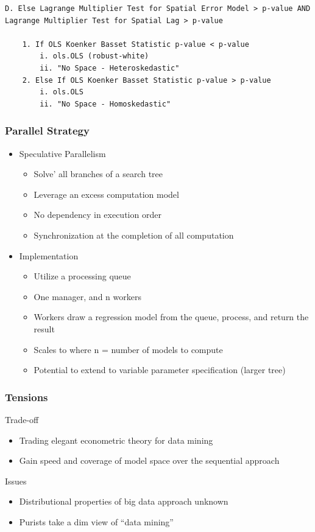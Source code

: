 \documentclass[usepdftitle=false,professionalfonts,compress ]{beamer}
\begin{document}
\begin{frame}[fragile,shrink=28]
\begin{tiny}
\begin{verbatim}
D. Else Lagrange Multiplier Test for Spatial Error Model > p-value AND Lagrange Multiplier Test for Spatial Lag > p-value

    1. If OLS Koenker Basset Statistic p-value < p-value
        i. ols.OLS (robust-white)
        ii. "No Space - Heteroskedastic"
    2. Else If OLS Koenker Basset Statistic p-value > p-value
        i. ols.OLS
        ii. "No Space - Homoskedastic"
\end{verbatim}
\end{tiny}
\end{frame}


{
\begin{frame}\frametitle{Parallel Strategy}
	\begin{itemize}

		\item Speculative Parallelism
		\begin{itemize}

			\item Solve' all branches of a search tree
			\item Leverage an excess computation model
			\item No dependency in execution order
			\item Synchronization at the completion of all computation
		\end{itemize}
		\item Implementation
		\begin{itemize}
			\item Utilize a processing queue
			\item One manager, and n workers
			\item Workers draw a regression model from the queue, process, and return the result
			\item Scales to where n = number of models to compute
			\item Potential to extend to variable parameter specification (larger tree)
		\end{itemize}
	\end{itemize}

\end{frame}
}

\begin{frame}\frametitle{Tensions}
	\begin{block}{Trade-off}
	\begin{itemize}
		\item Trading elegant econometric theory for data mining
		\item Gain speed and coverage of model space over the sequential
		approach
	\end{itemize}
	\end{block}
	\begin{block}{Issues}
	\begin{itemize}
		\item Distributional properties of big data approach unknown
		\item Purists take a dim view of ``data mining''
	\end{itemize}

	\end{block}
\end{frame}
\end{document}
